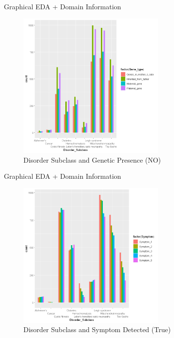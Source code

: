 \documentclass{beamer}
\begin{document}
\begin{frame}{Graphical EDA + Domain Information}
	
	\begin{figure}
		\includegraphics[width=0.65\textwidth, height=0.6\textheight]{gn.png}
		\caption{Disorder Subclass and Genetic Presence (NO)}
	\end{figure}
\end{frame}

\begin{frame}{Graphical EDA + Domain Information}

	\begin{figure}
		\includegraphics[width=0.65\textwidth, height=0.6\textheight]{s1.png}
		\caption{Disorder Subclass and Symptom Detected (True)}
	\end{figure}
\end{frame}
\end{document}
